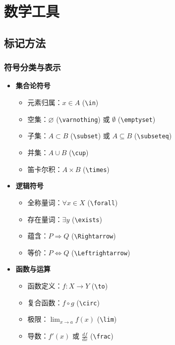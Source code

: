 \newpage
\section{数学工具}

\subsection{标记方法}
\subsubsection{符号分类与表示}
\begin{itemize}
    \item \textbf{集合论符号}
    \begin{itemize}
        \item 元素归属：$ x \in A $ (\verb|\in|)
        \item 空集：$ \varnothing $ (\verb|\varnothing|) 或 $\emptyset$ (\verb|\emptyset|)
        \item 子集：$A \subset B$ (\verb|\subset|) 或 $A \subseteq B$ (\verb|\subseteq|)
        \item 并集：$A \cup B$ (\verb|\cup|)
        \item 笛卡尔积：$A \times B$ (\verb|\times|)
    \end{itemize}

    \item \textbf{逻辑符号}
    \begin{itemize}
        \item 全称量词：$\forall x \in X$ (\verb|\forall|)
        \item 存在量词：$\exists y$ (\verb|\exists|)
        \item 蕴含：$P \Rightarrow Q$ (\verb|\Rightarrow|)
        \item 等价：$P \Leftrightarrow Q$ (\verb|\Leftrightarrow|)
    \end{itemize}

    \item \textbf{函数与运算}
    \begin{itemize}
        \item 函数定义：$f: X \to Y$ (\verb|\to|)
        \item 复合函数：$f \circ g$ (\verb|\circ|)
        \item 极限：$\lim_{x \to a} f(x)$ (\verb|\lim|)
        \item 导数：$f'(x)$ 或 $\frac{df}{dx}$ (\verb|\frac|)
    \end{itemize}
\end{itemize}

